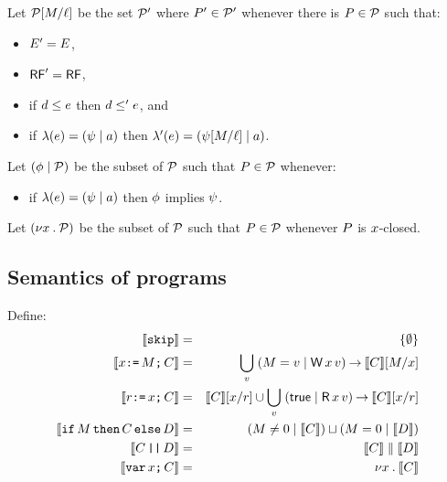Let $\mathcal{P}[M/\ell]$ be the set $\mathcal{P}'$ where $P'\in\mathcal{P}'$ whenever
there is $P\in\mathcal{P}$ such that:
\begin{itemize}
\item $E' = E$,
\item $\mathsf{RF}' = \mathsf{RF}$,
\item if $d \le e$ then $d \le' e$, and
\item if $\lambda(e) = (\psi \mid a)$ then $\lambda'(e) = (\psi[M/\ell] \mid a)$.
\end{itemize}
Let $(\phi \mid \mathcal{P})$ be the subset of $\mathcal{P}$ such that $P\in\mathcal{P}$ whenever:
\begin{itemize}
\item if $\lambda(e) = (\psi \mid a)$ then $\phi$ implies $\psi$.
\end{itemize}
Let $(\nu x\mathbin.\mathcal{P})$ be the subset of $\mathcal{P}$ such that $P\in\mathcal{P}$ whenever
$P$ is $x$-closed.

\subsection{Semantics of programs}

Define:
\begin{eqnarray*}
  \sem{\SKIP} & = & \{ \emptyset \} \\
  \sem{\aLoc\GETS\aExp\SEMI \aCmd} & = & \bigcup_\aVal\; (\aExp=\aVal \mid \DW\aLoc\aVal) \prefix \sem{\aCmd}[\aExp/\aLoc] \\
  \sem{\aReg\GETS\aLoc\SEMI \aCmd} & = & \sem{\aCmd}[\aLoc/\aReg] \cup \bigcup_\aVal\; (\TRUE \mid \DR\aLoc\aVal) \prefix \sem{\aCmd}[\aLoc/\aReg] \\
  \sem{\IF \aExp \THEN \aCmd \ELSE \bCmd} & = & (\aExp \neq 0 \mid \sem{\aCmd}) \sqcup (\aExp=0 \mid \sem{\bCmd}) \\
  \sem{\aCmd \PAR \bCmd} & = & \sem{\aCmd} \parallel \sem{\bCmd} \\
  \sem{\VAR\aLoc\SEMI \aCmd} & = & \nu \aLoc \st \sem{\aCmd}
\end{eqnarray*}

